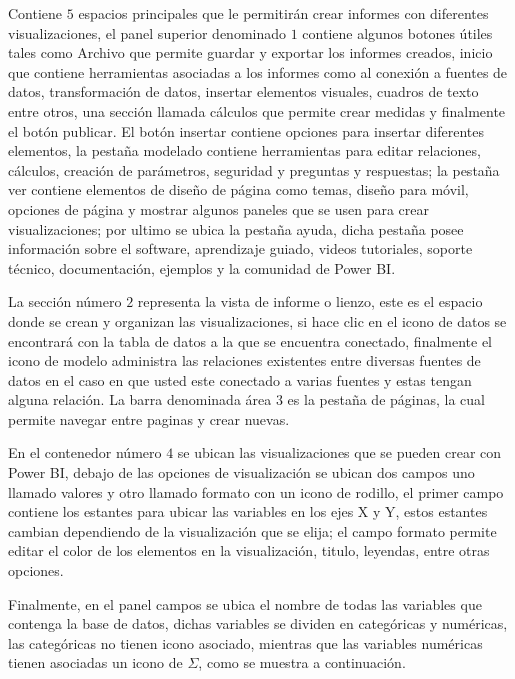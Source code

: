 \documentclass[
]{book}
\begin{document}
Contiene \(5\) espacios principales que le permitirán crear informes con diferentes visualizaciones, el panel superior denominado \(1\) contiene algunos botones útiles tales como Archivo que permite guardar y exportar los informes creados, inicio que contiene herramientas asociadas a los informes como al conexión a fuentes de datos, transformación de datos, insertar elementos visuales, cuadros de texto entre otros, una sección llamada cálculos que permite crear medidas y finalmente el botón publicar. El botón insertar contiene opciones para insertar diferentes elementos, la pestaña modelado contiene herramientas para editar relaciones, cálculos, creación de parámetros, seguridad y preguntas y respuestas; la pestaña ver contiene elementos de diseño de página como temas, diseño para móvil, opciones de página y mostrar algunos paneles que se usen para crear visualizaciones; por ultimo se ubica la pestaña ayuda, dicha pestaña posee información sobre el software, aprendizaje guiado, videos tutoriales, soporte técnico, documentación, ejemplos y la comunidad de Power BI.

La sección número \(2\) representa la vista de informe o lienzo, este es el espacio donde se crean y organizan las visualizaciones, si hace clic en el icono de datos se encontrará con la tabla de datos a la que se encuentra conectado, finalmente el icono de modelo administra las relaciones existentes entre diversas fuentes de datos en el caso en que usted este conectado a varias fuentes y estas tengan alguna relación. La barra denominada área \(3\) es la pestaña de páginas, la cual permite navegar entre paginas y crear nuevas.

En el contenedor número \(4\) se ubican las visualizaciones que se pueden crear con Power BI, debajo de las opciones de visualización se ubican dos campos uno llamado valores y otro llamado formato con un icono de rodillo, el primer campo contiene los estantes para ubicar las variables en los ejes X y Y, estos estantes cambian dependiendo de la visualización que se elija; el campo formato permite editar el color de los elementos en la visualización, titulo, leyendas, entre otras opciones.

Finalmente, en el panel campos se ubica el nombre de todas las variables que contenga la base de datos, dichas variables se dividen en categóricas y numéricas, las categóricas no tienen icono asociado, mientras que las variables numéricas tienen asociadas un icono de \(\Sigma\), como se muestra a continuación.
\end{document}
